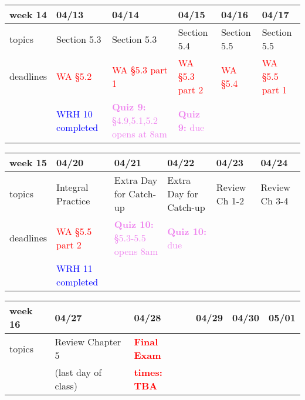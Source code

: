 \documentclass[11pt]{article}
\begin{document}
\begin{center}
\begin{tabularx}{\textwidth}{|p{1.5cm}|| L | L | L | L | L |}
\hline
week 14&04/13&04/14&04/15&04/16&04/17\\ \hline
topics &Section 5.3&Section 5.3&Section 5.4&Section 5.5&Section 5.5\\  \hline
deadlines&\textcolor{red}{WA \S 5.2}  &\textcolor{red}{WA \S 5.3 part 1}&\textcolor{red}{WA \S5.3 part 2}&\textcolor{red}{WA \S 5.4} & \textcolor{red}{WA \S 5.5 part 1}\\ 
&\textcolor{blue}{WRH 10 completed}&\textcolor{violet}{\textbf{Quiz 9:} \S4.9,5.1,5.2 opens at 8am }&\textcolor{violet}{\textbf{Quiz 9:}  due }&&\\ \hline \end{tabularx} \end{center}

\begin{center}
\begin{tabularx}{\textwidth}{|p{1.5cm}|| L | L | L | L | L |}
\hline
week 15&04/20&04/21&04/22&04/23&04/24\\ \hline
topics&Integral Practice&Extra Day for Catch-up&Extra Day for Catch-up&Review Ch 1-2&Review Ch 3-4\\ \hline
deadlines&\textcolor{red}{WA \S 5.5 part 2}&\textcolor{violet}{\textbf{Quiz 10:} \S 5.3-5.5 opens 8am }&\textcolor{violet}{\textbf{Quiz 10:} due }&&\\ 
&\textcolor{blue}{WRH 11 completed}&&&& \\ \hline \end{tabularx} \end{center}

\begin{center}
\begin{tabularx}{\textwidth}{|p{1.5cm}|| L | L | L | L | L |}
\hline
week 16&04/27&04/28&04/29&04/30&05/01\\ \hline
topics&Review Chapter 5&\textcolor{red}{\textbf{Final Exam}} &&&\\ 
&(last day of class)&\textcolor{red}{\textbf{times: TBA}}&&&\\ \hline \hline
\end{tabularx} \end{center}
\end{document}
